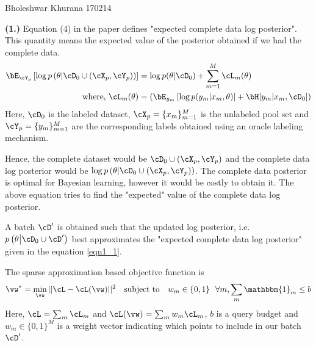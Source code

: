 \documentclass[a4paper,11pt]{article}
\begin{document}
{Bholeshwar Khurana}   %
{170214}	%


\begin{pmisolution}
\noindent \textbf{(1.) } Equation (4) in the paper defines "expected complete data log posterior". This quantity means the expected value of the posterior obtained if we had the complete data.
\begin{equation}
\label{eqn1_1}
\begin{split}
    \bE_{\cY_p}\left[ \log p\left(\theta \middle| \cD_0 \cup (\cX_p, \cY_p)\right) \right] &= \log p(\theta|\cD_0) + \sum_{m=1}^{M} \cL_m(\theta) \\
    \text{where, } \cL_m(\theta) &= \left( \bE_{y_m} \left[\log p(y_m | x_m, \theta)\right] + \bH[y_m | x_m, \cD_0] \right)
\end{split}
\end{equation}
Here, $\cD_0$ is the labeled dataset, $\cX_p = \{x_m\}_{m=1}^{M}$ is the unlabeled pool set and $\cY_p = \{y_m\}_{m=1}^{M}$ are the corresponding labels obtained using an oracle labeling mechanism.

Hence, the complete dataset would be $\cD_0 \cup (\cX_p, \cY_p)$ and the complete data log posterior would be $\log p\left(\theta \middle| \cD_0 \cup (\cX_p, \cY_p)\right)$. The complete data posterior is optimal for Bayesian learning, however it would be costly to obtain it. The above equation tries to find the "expected" value of the complete data log posterior.

A batch $\cD'$ is obtained such that the updated log posterior, i.e. $p\left(\theta \middle| \cD_0 \cup \cD'\right)$ best approximates the "expected complete data log posterior" given in the equation \ref{eqn1_1}.

The sparse approximation based objective function is 
\begin{equation}
\label{eqn1_2}
    \vw^* = \min_\vw || \cL - \cL(\vw) || ^2 \text{~~ subject to ~~} w_m \in \{0,1\} ~~ \forall m, \sum_m \mathbbm{1}_m \leq b
\end{equation}
Here, $\cL = \sum_m \cL_m$ and $\cL(\vw) = \sum_m w_m\cL_m$, $b$ is a query budget and $w_m \in \{0,1\}^M$ is a weight vector indicating which points to include in our batch $\cD'$.


\end{pmisolution}
\end{document}
